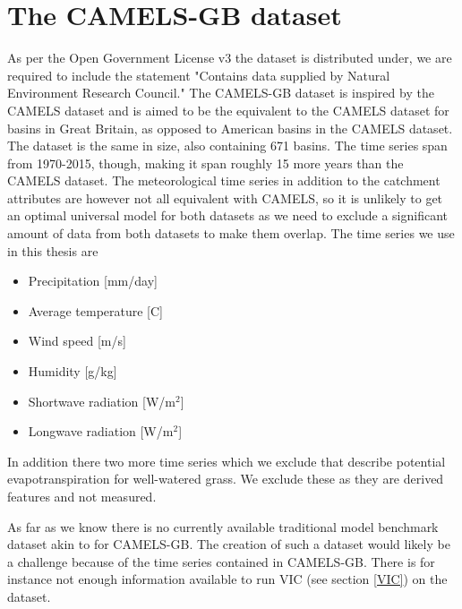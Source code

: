 \section{The CAMELS-GB dataset}
As per the Open Government License v3 the dataset is distributed under, we are required 
to include the statement "Contains data supplied by Natural Environment Research Council."
The CAMELS-GB dataset \citep{CAMELS_GB} is inspired by the CAMELS dataset and is 
aimed to be the equivalent to the CAMELS dataset for basins in Great Britain, 
as opposed to American basins in the CAMELS dataset. The dataset is the same in size,
also containing 671 basins. The time series span from 1970-2015, though, making 
it span roughly 15 more years than the CAMELS dataset.
 The meteorological time series in addition to the catchment attributes are however 
 not all equivalent with CAMELS, so it is unlikely to get an optimal universal model 
 for both datasets as we need to exclude a significant amount of data from both 
 datasets to make them overlap.
The time series we use in this thesis are
\begin{itemize}
    \item Precipitation [mm/day]
    \item Average temperature [C\degree]
    \item Wind speed [m/s]
    \item Humidity [g/kg]
    \item Shortwave radiation [W/m$^2$]
    \item Longwave radiation [W/m$^2$]
\end{itemize}
In addition there two more time series which we exclude that describe potential 
evapotranspiration for well-watered grass. We exclude these as they are derived 
features and not measured.


As far as we know there is no currently available traditional model benchmark dataset 
akin to \cite{CAMELS_hydroshare} for CAMELS-GB. The creation of such a dataset would 
likely be a challenge because of the time series contained in CAMELS-GB. There is for 
instance not enough information available to run VIC (see section \ref{VIC}) on 
the dataset.
